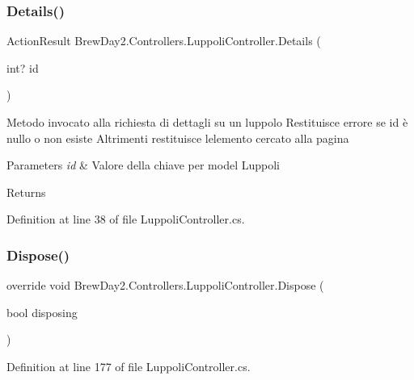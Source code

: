 \subsubsection{\texorpdfstring{Details()}{Details()}}
{\footnotesize\ttfamily Action\+Result Brew\+Day2.\+Controllers.\+Luppoli\+Controller.\+Details (\begin{DoxyParamCaption}\item[{int?}]{id }\end{DoxyParamCaption})}



Metodo invocato alla richiesta di dettagli su un luppolo Restituisce errore se id è nullo o non esiste Altrimenti restituisce l\textquotesingle{}elemento cercato alla pagina 


\begin{DoxyParams}{Parameters}
{\em id} & Valore della chiave per model Luppoli\\
\hline
\end{DoxyParams}
\begin{DoxyReturn}{Returns}

\end{DoxyReturn}


Definition at line 38 of file Luppoli\+Controller.\+cs.

\mbox{\label{class_brew_day2_1_1_controllers_1_1_luppoli_controller_a43473eb90a2214b37ccc3364982dc1a6}} 
\subsubsection{\texorpdfstring{Dispose()}{Dispose()}}
{\footnotesize\ttfamily override void Brew\+Day2.\+Controllers.\+Luppoli\+Controller.\+Dispose (\begin{DoxyParamCaption}\item[{bool}]{disposing }\end{DoxyParamCaption})\hspace{0.3cm}{\ttfamily [protected]}}



Definition at line 177 of file Luppoli\+Controller.\+cs.

\mbox{\label{class_brew_day2_1_1_controllers_1_1_luppoli_controller_a22134f379cb303fbb319310cb41fe259}} 
